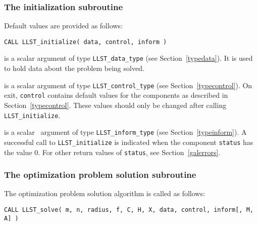 \documentclass{galahad}
\newcommand{\packagename}{LLST}
\begin{document}
\subsubsection{The initialization subroutine}\label{subinit}
 Default values are provided as follows:

\hskip0.5in 
{\tt CALL \packagename\_initialize( data, control, inform )}

\begin{description}

 is a scalar \intentinout argument of type 
{\tt \packagename\_data\_type}
(see Section~\ref{typedata}). It is used to hold data about the problem being 
solved. 

 is a scalar \intentout argument of type 
{\tt \packagename\_control\_type}
(see Section~\ref{typecontrol}). 
On exit, {\tt control} contains default values for the components as
described in Section~\ref{typecontrol}.
These values should only be changed after calling 
{\tt \packagename\_initialize}.

 is a scalar \intentout\ argument of type 
{\tt \packagename\_inform\_type}
(see Section~\ref{typeinform}). A successful call to
{\tt \packagename\_initialize}
is indicated when the  component {\tt status} has the value 0. 
For other return values of {\tt status}, see Section~\ref{galerrors}.

\end{description}


\subsubsection{The optimization problem solution subroutine}
The optimization problem solution algorithm is called as follows:

\hskip0.5in 
{\tt CALL \packagename\_solve( m, n, radius, f, C, H, X, data, control, inform[, M, A] )}
\end{document}
